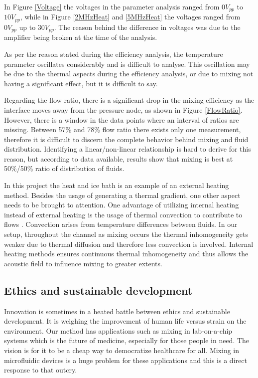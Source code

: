 \documentclass[twoside,twocolumn,9pt,a4paper]{IEEEtran}
\begin{document}
In Figure \ref{Voltage} the voltages in the parameter analysis ranged from $0 V_{pp}$ to $10 V_{pp}$, while in Figure \ref{2MHzHeat} and \ref{5MHzHeat} the voltages ranged from $0 V_{pp}$ up to $30 V_{pp}$. The reason behind the difference in voltages was due to the amplifier being broken at the time of the analysis.

As per the reason stated during the efficiency analysis, the temperature parameter oscillates considerably and is difficult to analyse. This oscillation may be due to the thermal aspects during the efficiency analysis, or due to mixing not having a significant effect, but it is difficult to say.

Regarding the flow ratio, there is a significant drop in the mixing efficiency as the interface moves away from the pressure node, as shown in Figure \ref{FlowRatio}. However, there is a window in the data points where an interval of ratios are missing. Between 57\% and 78\% flow ratio there exists only one measurement, therefore it is difficult to discern the complete behavior behind mixing and fluid distribution. Identifying a linear/non-linear relationship is hard to derive for this reason, but according to data available, results show that mixing is best at 50\%/50\% ratio of distribution of fluids.

In this project the heat and ice bath is an example of an external heating method. Besides the usage of generating a thermal gradient, one other aspect needs to be brought to attention. One advantage of utilizing internal heating instead of external heating is the usage of thermal convection to contribute to flows \cite{Corato}. Convection arises from temperature differences between fluids. In our setup, throughout the channel as mixing occurs the thermal inhomogeneity gets weaker due to thermal diffusion and therefore less convection is involved. Internal heating methods ensures continuous thermal inhomogeneity and thus allows the acoustic field to influence mixing to greater extents.

\subsection{Ethics and sustainable development}

Innovation is sometimes in a heated battle between ethics and sustainable development. It is weighing the improvement of human life versus strain on the environment. Our method has applications such as mixing in lab-on-a-chip systems which is the future of medicine, especially for those people in need. The vision is for it to be a cheap way to democratize healthcare for all. Mixing in microfluidic devices is a huge problem for these applications and this is a direct response to that outcry.
\end{document}
